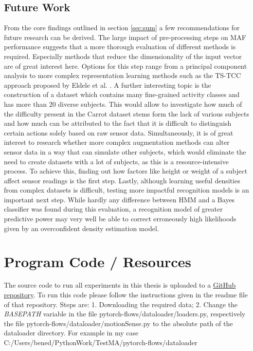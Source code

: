 \documentclass[11pt,titlepage,oneside,openany]{book}
\begin{document}
\section{Future Work}
\label{sec:future}
From the core findings outlined in section \ref{sec:sum} a few recommendations for future research can be derived. The large impact of pre-processing steps on MAF performance suggests that a more thorough evaluation of different methods is required. Especially methods that reduce the dimensionality of the input vector are of great interest here. Options for this step range from a principal component analysis to more complex representation learning methods such as the TS-TCC approach proposed by Eldele et al. \cite{eldele_time-series_2021}. A further interesting topic is the construction of a dataset which contains many fine-grained activity classes and has more than 20 diverse subjects. This would allow to investigate how much of the difficulty present in the Carrot dataset stems form the lack of various subjects and how much can be attributed to the fact that it is difficult to distinguish certain actions solely based on raw sensor data. Simultaneously, it  is of great interest to research whether more complex augmentation methods can alter sensor data in a way that can simulate other subjects, which would eliminate the need to create datasets with a lot of subjects, as this is a resource-intensive process. To achieve this, finding out how factors like height or weight of a subject affect sensor readings is the first step. Lastly, although learning useful densities from complex datasets is difficult, testing more impactful recognition models is an important next step. While hardly any difference between HMM and a Bayes classifier was found during this evaluation, a recognition model of greater predictive power may very well be able to correct erroneously high likelihoods given by an overconfident density estimation model.





\appendix

\chapter{Program Code / Resources}
\label{cha:appendix-a}

The source code to run all experiments in this thesis is uploaded to a \href{https://github.com/blasotta/CCBM_HAR}{GitHub repository}. To run this code please follow the instructions given in the readme file of that repository. Steps are: 1. Downloading the required data; 2. Change the \emph{BASEPATH} variable in the file pytorch-flows\slash dataloader\slash loaders.py, respectively the file pytorch-flows\slash dataloader\slash motionSense.py to the absolute path of the dataloader directory. For example in my case C:\slash Users\slash bened\slash PythonWork\slash Test\textunderscore MA\slash pytorch-flows\slash dataloader
\end{document}
